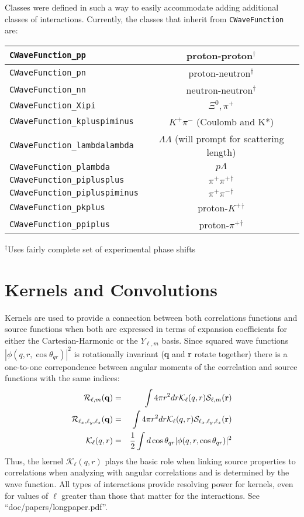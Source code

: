 \documentclass[10pt]{article}
\begin{document}
Classes were defined in such a way to easily accommodate adding additional classes of interactions. Currently, the classes that inherit from {\tt CWaveFunction} are:
\begin{center}
\begin{tabular}{|l|c|}\hline
{\tt CWaveFunction\_pp} & proton-proton$^\dagger$\\ \hline
{\tt CWaveFunction\_pn} & proton-neutron$^\dagger$\\ \hline
{\tt CWaveFunction\_nn} & neutron-neutron$^\dagger$\\ \hline
{\tt CWaveFunction\_Xipi} & $\Xi^0,\pi^+$\\ \hline
{\tt CWaveFunction\_kpluspiminus} & $K^+\pi^-$ (Coulomb and K*)\\ \hline
{\tt CWaveFunction\_lambdalambda} & $\Lambda\Lambda$ 
(will prompt for scattering length)\\ \hline
{\tt CWaveFunction\_plambda} & $p\Lambda$ \\ \hline
{\tt CWaveFunction\_piplusplus} & $\pi^+\pi^+$$^\dagger$\\ \hline
{\tt CWaveFunction\_pipluspiminus} & $\pi^+\pi^-$$^\dagger$\\ \hline
{\tt CWaveFunction\_pkplus} & proton-$K^+$$^\dagger$\\ \hline
{\tt CWaveFunction\_ppiplus} & proton-$\pi^+$$^\dagger$\\ \hline
\end{tabular}
\end{center}
$^\dagger${\small Uses fairly complete set of experimental phase shifts}

\section{Kernels and Convolutions}

Kernels are used to provide a connection between both correlations functions and source functions when both are expressed in terms of expansion coefficients for either the Cartesian-Harmonic or the $Y_{\ell,m}$ basis. Since squared wave functions $|\phi(q,r,\cos\theta_{qr})|^2$ is rotationally invariant ({\bf q} and {\bf r} rotate together) there is a one-to-one correpondence between angular moments of the correlation and source functions with the same indices:
\begin{eqnarray}
{\mathcal R}_{\ell,m}({\bf q})&=&\int 4\pi r^2dr 
{\mathcal K}_\ell(q,r) {\mathcal S}_{\ell,m}({\bf r})\\
{\mathcal R}_{\ell_x,\ell_y,\ell_z}({\bf q})&=&\int 4\pi r^2dr 
{\mathcal K}_{\ell}(q,r) {\mathcal S}_{\ell_x,\ell_y,\ell_z}({\bf r})\\
{\mathcal K}_{\ell}(q,r)&=&\frac{1}{2}\int d\cos\theta_{qr}
|\phi(q,r,\cos\theta_{qr})|^2
\end{eqnarray}
Thus, the kernel ${\mathcal K}_\ell(q,r)$ plays the basic role when linking source properties to correlations when analyzing with angular correlations and is determined by the wave function. All types of interactions provide resolving power for kernels, even for values of $\ell$ greater than those that matter for the interactions. See ``doc/papers/longpaper.pdf''.
\end{document}
